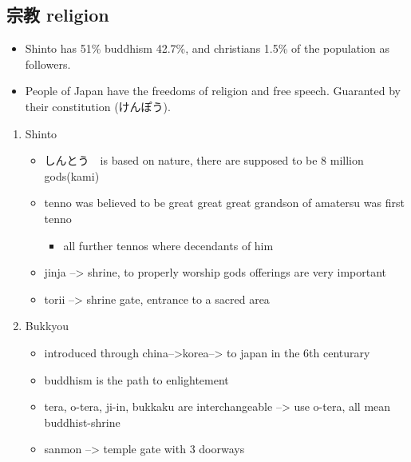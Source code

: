 \documentclass{article}
\newcommand\tabni[1][0.2cm]{\hspace*{#1}}
\begin{document}
\subsection{宗教 \tabni religion}
\begin{itemize}%
\item Shinto has 51\% buddhism 42.7\%, and christians 1.5\% of the population as followers.
\item People of Japan have the freedoms of religion and free speech. Guaranted by their constitution (けんぽう). \\
\end{itemize}
\begin{enumerate}
\item {} \tabni Shinto
\begin{itemize}%
\item しんとう　is based on nature, there are supposed to be 8 million gods(kami)
\item tenno was believed to be great great great grandson of amatersu was first tenno
\begin{itemize}%
\item all further tennos where decendants of him
\end{itemize}
\item jinja --> shrine, to properly worship gods offerings are very important
\item torii --> shrine gate, entrance to a sacred area \\
\end{itemize}
\item {} \tabni Bukkyou
\begin{itemize}
\item introduced through china-->korea--> to japan in the 6th centurary
\item buddhism is the path to enlightement
\item tera, o-tera, ji-in, bukkaku are interchangeable --> use o-tera, all mean buddhist-shrine
\item sanmon --> temple gate with 3 doorways \\
\end{itemize}


\end{enumerate}
\end{document}
